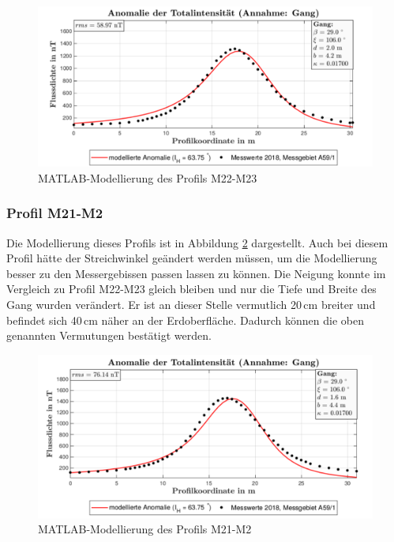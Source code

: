 \begin{figure}
 \centering
 \includegraphics[width=\textwidth]{fig/modM22}
 \caption{MATLAB-Modellierung des Profils M22-M23}
 \label{fig:modM22}
\end{figure}

\subsubsection{Profil M21-M2}

Die Modellierung dieses Profils ist in Abbildung \ref{fig:modM21} dargestellt. Auch bei diesem Profil hätte der Streichwinkel geändert werden müssen, um die Modellierung besser zu den Messergebissen passen lassen zu können. Die Neigung konnte im Vergleich zu Profil M22-M23 gleich bleiben und nur die Tiefe und Breite des Gang wurden verändert. Er ist an dieser Stelle vermutlich 20\,cm breiter und befindet sich 40\,cm näher an der Erdoberfläche. Dadurch können die oben genannten Vermutungen bestätigt werden.

\begin{figure}
 \centering
 \includegraphics[width=\textwidth]{fig/modM21}
 \caption{MATLAB-Modellierung des Profils M21-M2}
 \label{fig:modM21}
\end{figure}

